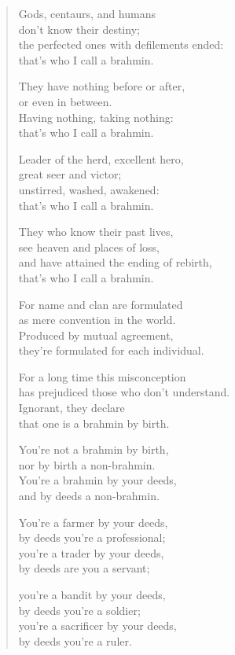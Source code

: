 \documentclass[12pt,openany]{book}%
\begin{document}
\begin{verse}
Gods, centaurs, and humans \\
don’t know their destiny; \\
the perfected ones with defilements ended: \\
that’s who I call a brahmin. 

They have nothing before or after, \\
or even in between. \\
Having nothing, taking nothing: \\
that’s who I call a brahmin. 

Leader of the herd, excellent hero, \\
great seer and victor; \\
unstirred, washed, awakened: \\
that’s who I call a brahmin. 

They who know their past lives, \\
see heaven and places of loss, \\
and have attained the ending of rebirth, \\
that’s who I call a brahmin. 

For name and clan are formulated \\
as mere convention in the world. \\
Produced by mutual agreement, \\
they’re formulated for each individual. 

For a long time this misconception \\
has prejudiced those who don’t understand. \\
Ignorant, they declare \\
that one is a brahmin by birth. 

You’re not a brahmin by birth, \\
nor by birth a non-brahmin. \\
You’re a brahmin by your deeds, \\
and by deeds a non-brahmin. 

You’re a farmer by your deeds, \\
by deeds you’re a professional; \\
you’re a trader by your deeds, \\
by deeds are you a servant; 

you’re a bandit by your deeds, \\
by deeds you’re a soldier; \\
you’re a sacrificer by your deeds, \\
by deeds you’re a ruler. 


\end{verse}
\end{document}
